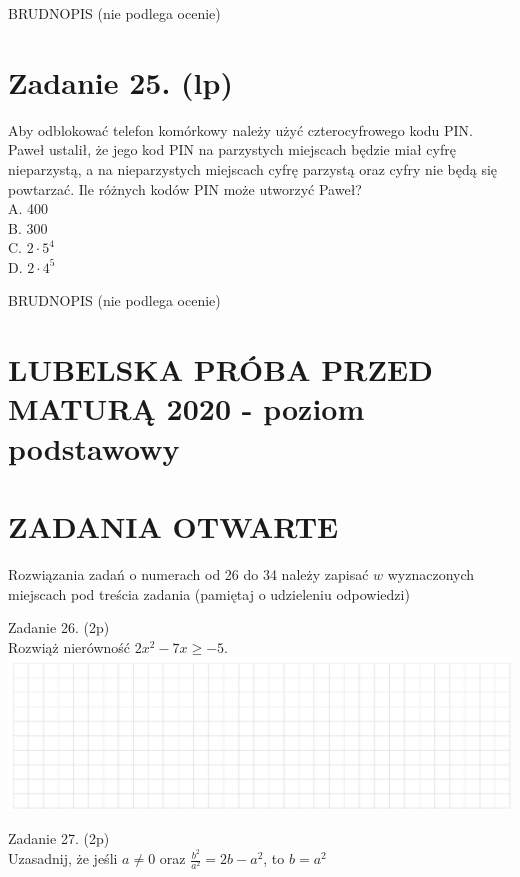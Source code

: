 \documentclass[10pt]{article}
\begin{document}
BRUDNOPIS (nie podlega ocenie)

\section*{Zadanie 25. (lp)}
Aby odblokować telefon komórkowy należy użyć czterocyfrowego kodu PIN. Paweł ustalił, że jego kod PIN na parzystych miejscach będzie miał cyfrę nieparzystą, a na nieparzystych miejscach cyfrę parzystą oraz cyfry nie będą się powtarzać. Ile różnych kodów PIN może utworzyć Paweł?\\
A. 400\\
B. 300\\
C. \(2 \cdot 5^{4}\)\\
D. \(2 \cdot 4^{5}\)

BRUDNOPIS (nie podlega ocenie)

\section*{LUBELSKA PRÓBA PRZED MATURĄ 2020 - poziom podstawowy}
\section*{ZADANIA OTWARTE}
Rozwiązania zadań o numerach od 26 do 34 należy zapisać \(w\) wyznaczonych miejscach pod treścia zadania (pamiętaj o udzieleniu odpowiedzi)

Zadanie 26. (2p)\\
Rozwiąż nierówność \(2 x^{2}-7 x \geq-5\).\\
\includegraphics[max width=\textwidth, center]{2024_11_21_c2f4637e26cc7e4291d3g-09(1)}

Zadanie 27. (2p)\\
Uzasadnij, że jeśli \(a \neq 0\) oraz \(\frac{b^{2}}{a^{2}}=2 b-a^{2}\), to \(b=a^{2}\)
\end{document}

